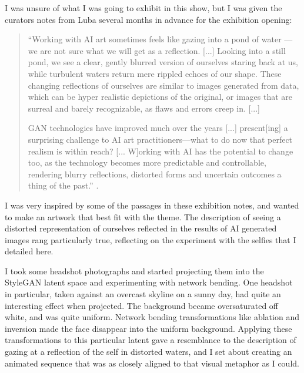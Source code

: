 I was unsure of what I was going to exhibit in this show, but I was given the curators notes from Luba several months in advance for the exhibition opening: 

\begin{quote}
``Working with AI art sometimes feels like gazing into a pond of water — we are not sure what we will get as a reflection. [...] Looking into a still pond, we see a clear, gently blurred version of ourselves staring back at us, while turbulent waters return mere rippled echoes of our shape. These changing reflections of ourselves are similar to images generated from data, which can be hyper realistic depictions of the original, or images that are surreal and barely recognizable, as flaws and errors creep in. [...]

GAN technologies have improved much over the years [...] present[ing] a surprising challenge to AI art practitioners—what to do now that perfect realism is within reach? [... W]orking with AI has the potential to change too, as the technology becomes more predictable and controllable, rendering blurry reflections, distorted forms and uncertain outcomes a thing of the past.'' \citep{elliot2021reflections}.
\end{quote}

I was very inspired by some of the passages in these exhibition notes, and wanted to make an artwork that best fit with the theme. 
The description of seeing a distorted representation of ourselves reflected in the results of AI generated images rang particularly true, reflecting on the experiment with the selfies that I detailed here.

I took some headshot photographs and started projecting them into the StyleGAN latent space and experimenting with network bending. 
One headshot in particular, taken against an overcast skyline on a sunny day, had quite an interesting effect when projected. 
The background became oversaturated off white, and was quite uniform. Network bending transformations like ablation and inversion made the face disappear into the uniform background. 
Applying these transformations to this particular latent gave a resemblance to the description of gazing at a reflection of the self in distorted waters, and I set about creating an animated sequence that was as closely aligned to that visual metaphor as I could.

